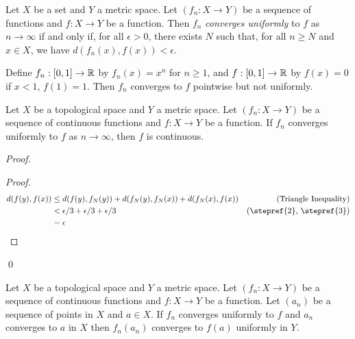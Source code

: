 \begin{definition}
    Let $X$ be a set and $Y$ a metric space. Let $(f_n : X \rightarrow Y)$ be a sequence of functions and $f : X \rightarrow Y$ be a function.
    Then $f_n$ \emph{converges uniformly} to $f$ as $n \rightarrow \infty$ if and only if, for all $\epsilon > 0$, there exists $N$ such that, for all $n \geq N$ and $x \in X$,
    we have $d(f_n(x),f(x)) < \epsilon$.
\end{definition}

\begin{example}
    Define $f_n : [0,1] \rightarrow \mathbb{R}$ by $f_n(x) = x^n$ for $n \geq 1$, and $f : [0,1] \rightarrow \mathbb{R}$ by $f(x) = 0$ if $x < 1$, $f(1) = 1$.  Then $f_n$ converges to $f$
    pointwise but not uniformly.
\end{example}

\begin{theorem}
    Let $X$ be a topological space and $Y$ a metric space.  Let $(f_n : X \rightarrow Y)$ be a sequence of continuous functions and $f : X \rightarrow Y$ be a function.
    If $f_n$ converges uniformly to $f$ as $n \rightarrow \infty$, then $f$ is continuous.
\end{theorem}

\begin{proof}
    \pf
    \begin{proof}
        \pf
        \begin{align*}
            d(f(y),f(x)) & \leq d(f(y),f_N(y)) + d(f_N(y),f_N(x)) + d(f_N(x),f(x)) & (\text{Triangle Inequality}) \\
            & < \epsilon / 3 + \epsilon / 3 + \epsilon / 3 & (\text{\stepref{2}, \stepref{3}})\\
            & = \epsilon
        \end{align*}
    \end{proof}
    \qed
\end{proof}

\begin{proposition}
    Let $X$ be a topological space and $Y$ a metric space.  Let $(f_n : X \rightarrow Y)$ be a sequence of continuous functions and $f : X \rightarrow Y$ be a function.
    Let $(a_n)$ be a sequence of points in $X$ and $a \in X$. If $f_n$ converges uniformly to $f$ and $a_n$ converges to $a$ in $X$ then $f_n(a_n)$ converges to $f(a)$
    uniformly in $Y$.
\end{proposition}

